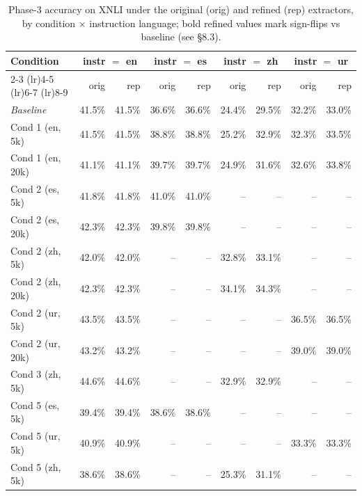 \begin{table}[t]
  \centering
  \small
  \begin{tabular}{lrrrrrrrr}
    \toprule
    Condition & \multicolumn{2}{c}{instr $=$ en} & \multicolumn{2}{c}{instr $=$ es} & \multicolumn{2}{c}{instr $=$ zh} & \multicolumn{2}{c}{instr $=$ ur} \\
    \cmidrule(lr){2-3} \cmidrule(lr){4-5} \cmidrule(lr){6-7} \cmidrule(lr){8-9}
     & orig & rep & orig & rep & orig & rep & orig & rep \\
    \midrule
    \textit{Baseline} & 41.5\% & 41.5\% & 36.6\% & 36.6\% & 24.4\% & 29.5\% & 32.2\% & 33.0\% \\
    Cond 1 (en, 5k) & 41.5\% & 41.5\% & 38.8\% & 38.8\% & 25.2\% & 32.9\% & 32.3\% & 33.5\% \\
    Cond 1 (en, 20k) & 41.1\% & 41.1\% & 39.7\% & 39.7\% & 24.9\% & 31.6\% & 32.6\% & 33.8\% \\
    Cond 2 (es, 5k) & 41.8\% & 41.8\% & 41.0\% & 41.0\% & -- & -- & -- & -- \\
    Cond 2 (es, 20k) & 42.3\% & 42.3\% & 39.8\% & 39.8\% & -- & -- & -- & -- \\
    Cond 2 (zh, 5k) & 42.0\% & 42.0\% & -- & -- & 32.8\% & 33.1\% & -- & -- \\
    Cond 2 (zh, 20k) & 42.3\% & 42.3\% & -- & -- & 34.1\% & 34.3\% & -- & -- \\
    Cond 2 (ur, 5k) & 43.5\% & 43.5\% & -- & -- & -- & -- & 36.5\% & 36.5\% \\
    Cond 2 (ur, 20k) & 43.2\% & 43.2\% & -- & -- & -- & -- & 39.0\% & 39.0\% \\
    Cond 3 (zh, 5k) & 44.6\% & 44.6\% & -- & -- & 32.9\% & 32.9\% & -- & -- \\
    Cond 5 (es, 5k) & 39.4\% & 39.4\% & 38.6\% & 38.6\% & -- & -- & -- & -- \\
    Cond 5 (ur, 5k) & 40.9\% & 40.9\% & -- & -- & -- & -- & 33.3\% & 33.3\% \\
    Cond 5 (zh, 5k) & 38.6\% & 38.6\% & -- & -- & 25.3\% & 31.1\% & -- & -- \\
    \bottomrule
  \end{tabular}
  \caption{Phase-3 accuracy on \textsc{XNLI} under the original (orig) and refined (rep) extractors, by condition $\times$ instruction language; bold refined values mark sign-flips vs baseline (see \S8.3).}
  \label{tab:t3-xnli}
\end{table}

